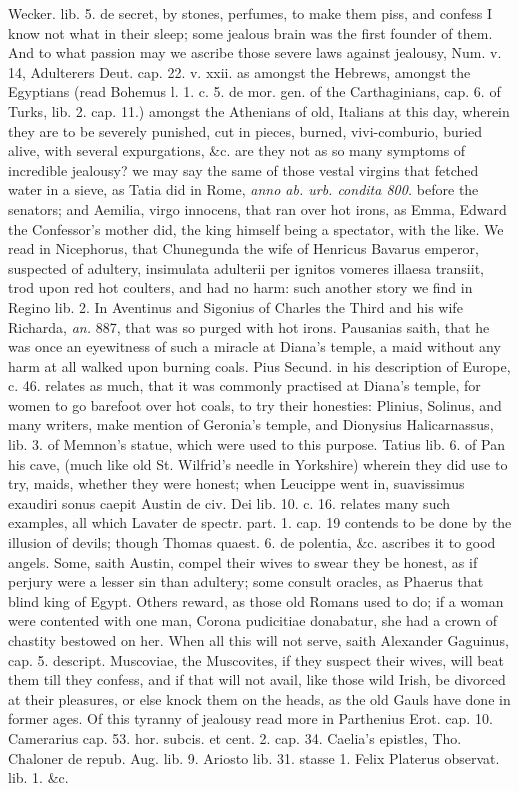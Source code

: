 {Wecker. lib. 5. de secret, by stones, perfumes, to make them piss, and
confess I know not what in their sleep; some jealous brain was the
first founder of them. And to what passion may we ascribe those severe
laws against jealousy, Num. v. 14, Adulterers Deut. cap. 22. v. xxii.
as amongst the Hebrews, amongst the Egyptians (read Bohemus l. 1.
c. 5. de mor. gen. of the Carthaginians, cap. 6. of Turks, lib. 2. cap.
11.) amongst the Athenians of old, Italians at this day, wherein they
are to be severely punished, cut in pieces, burned, vivi-comburio,
buried alive, with several expurgations, \&c. are they not as so many
symptoms of incredible jealousy? we may say the same of those vestal
virgins that fetched water in a sieve, as Tatia did in Rome, \emph{anno ab.
urb. condita 800.} before the senators; and Aemilia, virgo
innocens, that ran over hot irons, as Emma, Edward the Confessor's
mother did, the king himself being a spectator, with the like. We read
in Nicephorus, that Chunegunda the wife of Henricus Bavarus emperor,
suspected of adultery, insimulata adulterii per ignitos vomeres illaesa
transiit, trod upon red hot coulters, and had no harm: such another
story we find in Regino lib. 2. In Aventinus and Sigonius of Charles
the Third and his wife Richarda, \emph{an.} 887, that was so purged with hot
irons. Pausanias saith, that he was once an eyewitness of such a
miracle at Diana's temple, a maid without any harm at all walked upon
burning coals. Pius Secund. in his description of Europe, c. 46.
relates as much, that it was commonly practised at Diana's temple, for
women to go barefoot over hot coals, to try their honesties: Plinius,
Solinus, and many writers, make mention of Geronia's temple, and
Dionysius Halicarnassus, lib. 3. of Memnon's statue, which were used to
this purpose. Tatius lib. 6. of Pan his cave, (much like old St.
Wilfrid's needle in Yorkshire) wherein they did use to try, maids,
whether they were honest; when Leucippe went in, suavissimus
exaudiri sonus caepit Austin de civ. Dei lib. 10. c. 16. relates many
such examples, all which Lavater de spectr. part. 1. cap. 19 contends
to be done by the illusion of devils; though Thomas quaest. 6. de
polentia, \&c. ascribes it to good angels. Some, saith Austin,
compel their wives to swear they be honest, as if perjury were a lesser
sin than adultery; some consult oracles, as Phaerus that blind
king of Egypt. Others reward, as those old Romans used to do; if a
woman were contented with one man, Corona pudicitiae donabatur, she had
a crown of chastity bestowed on her. When all this will not serve,
saith Alexander Gaguinus, cap. 5. descript. Muscoviae, the Muscovites,
if they suspect their wives, will beat them till they confess, and if
that will not avail, like those wild Irish, be divorced at their
pleasures, or else knock them on the heads, as the old Gauls have
done in former ages. Of this tyranny of jealousy read more in
Parthenius Erot. cap. 10. Camerarius cap. 53. hor. subcis. et cent. 2.
cap. 34. Caelia's epistles, Tho. Chaloner de repub. Aug. lib. 9.
Ariosto lib. 31. stasse 1. Felix Platerus observat. lib. 1. \&c.

}
